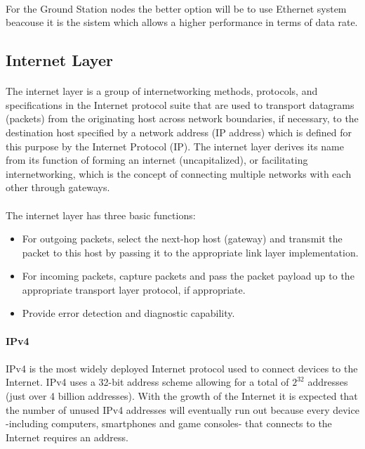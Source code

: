 \paragraph{}
For the Ground Station nodes the better option will be to use Ethernet system beacouse it is the sistem which allows a higher performance in terms of data rate.


\subsection{Internet Layer}
\paragraph{}
The internet layer is a group of internetworking methods, protocols, and specifications in the Internet protocol suite that are used to transport datagrams (packets) from the originating host across network boundaries, if necessary, to the destination host specified by a network address (IP address) which is defined for this purpose by the Internet Protocol (IP). The internet layer derives its name from its function of forming an internet (uncapitalized), or facilitating internetworking, which is the concept of connecting multiple networks with each other through gateways.
\paragraph{}
The internet layer has three basic functions:
\begin{itemize}
\item For outgoing packets, select the next-hop host (gateway) and transmit the packet to this host by passing it to the appropriate link layer implementation.
\item For incoming packets, capture packets and pass the packet payload up to the appropriate transport layer protocol, if appropriate.
\item Provide error detection and diagnostic capability.
\end{itemize}

\paragraph{} \textbf{IPv4}
\paragraph{}
IPv4 is the most widely deployed Internet protocol used to connect devices to the Internet. IPv4 uses a 32-bit address scheme allowing for a total of $ 2^{32} $ addresses (just over 4 billion addresses).  With the growth of the Internet it is expected that the number of unused IPv4 addresses will eventually run out because every device -including computers, smartphones and game consoles- that connects to the Internet requires an address.

